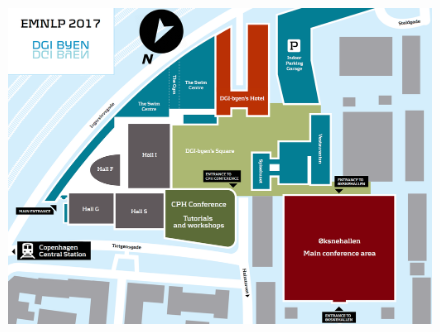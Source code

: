 

\begin{figure}[p]
\centering
\includegraphics[height=\textwidth,angle=90,origin=c]{content/fmatter/venue_map_small.png}
\end{figure}


